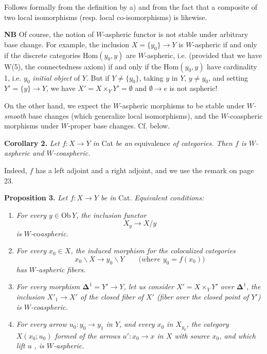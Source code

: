 \documentclass[11pt,leqno]{article}
\newcommand{\printedpage}[1]{\marginpar{\footnotesize p.~#1}}
\newcommand{\msp}[1]{\marginpar{\footnotesize [#1]}}
\newcommand{\Ob}{\mathrm{Ob}\,}
\begin{document}
Follows formally from the definition by a) and from the fact that a composite of two local isomorphisms (resp. local co-isomorphisms) is likewise.

\textbf{NB} Of course, the notion of $W$-aspheric functor is not stable under arbitrary base change. For example, the inclusion $X = \{y_0\} \longrightarrow Y$ is $W$-aspheric if and only if the discrete categories $\mathrm{Hom}(y_0, y)$ are $W$-aspheric, i.e. (provided that we have W(5), the connectedness axiom) if and only if the $\mathrm{Hom}(y_0, y)$ have cardinality 1, i.e. $y_0$ \textit{initial object} of $Y$. But if $Y \neq \{y_0\}$, taking $y$ in $Y$, $y \neq y_0$, and setting $Y' = \{y\} \longrightarrow Y$, we have $X' = X \times_Y Y' = \emptyset$ and $\emptyset \longrightarrow e$ is not aspheric!

\msp{page 26}On the other hand, we expect the $W$-aspheric morphisms to be stable under \textit{$W$-smooth} base changes (which generalize local isomorphisms), and the $W$-coaspheric morphisms under $W$-proper base changes. Cf. below.

\textbf{Corollary 2.} \textit{Let $f : X \longrightarrow Y$ in} \textup{Cat} \textit{be an} \textup{equivalence} \textit{of categories. Then $f$ is $W$-aspheric and $W$-coaspheric.}

Indeed, $f$ has a left adjoint and a right adjoint, and we use the remark on page 23.

\textbf{Proposition 3.} \textit{Let $f : X \longrightarrow Y$ be in} \textup{Cat}. \textit{Equivalent conditions:}

\printedpage{22}

\begin{enumerate}
\item[\textit{a)}] \textit{For every $y \in \Ob Y$, the inclusion functor}
\[
X_y \longrightarrow X/y \tag*{$(*)$}
\]
\textit{is $W$-}co\textit{aspheric.}
\item[\textit{b)}] \textit{For every $x_0 \in X$, the induced morphism for the colocalized categories}
\[
x_0\backslash X \longrightarrow y_0\backslash Y \qquad \textit{(where $y_0 = f(x_0)$)}
\]
\textit{has $W$-aspheric fibers.}
\item[\textit{c)}] \textit{For every morphism $\mathbf{\Delta}^1 = Y' \longrightarrow Y$, let us consider $X' = X \times_Y Y'$ over $\mathbf{\Delta}^1$, the inclusion $X'_1 \longrightarrow X'$ of the closed fiber of $X'$ (fiber over the closed point of $Y'$) is $W$-coaspheric.}
\item[\textit{d)}] \textit{For every arrow $u_0 : y_0 \longrightarrow y_1$ in $Y$, and every $x_0$ in $X_{y_0}$, the category $X(x_0;u_0)$ formed of the arrows $u' : x_0 \longrightarrow x$ in $X$ with source $x_0$, and which lift $u$} \textit{, is $W$-aspheric.}
\end{enumerate}
\end{document}
